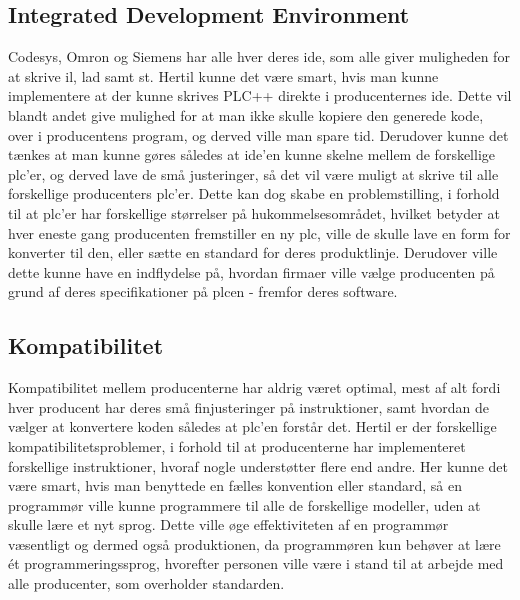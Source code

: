 \subsection*{Integrated Development Environment}
Codesys, Omron og Siemens har alle hver deres \gls{ide}, som alle giver muligheden for at skrive \gls{il}, \gls{lad} samt \gls{st}.
Hertil kunne det være smart, hvis man kunne implementere at der kunne skrives PLC++ direkte i producenternes \gls{ide}. Dette vil blandt andet give mulighed for at man ikke skulle kopiere den generede kode, over i producentens program, og derved ville man spare tid.
\noindent Derudover kunne det tænkes at man kunne gøres således at \gls{ide}'en kunne skelne mellem de forskellige \gls{plc}'er, og derved lave de små justeringer, så det vil være muligt at skrive til alle forskellige producenters \gls{plc}'er.
Dette kan dog skabe en problemstilling, i forhold til at \gls{plc}'er har forskellige størrelser på hukommelsesområdet, hvilket betyder at hver eneste gang producenten fremstiller en ny \gls{plc}, ville de skulle lave en form for konverter til den, eller sætte en standard for deres produktlinje.
Derudover ville dette kunne have en indflydelse på, hvordan firmaer ville vælge producenten på grund af deres specifikationer på \gls{plc}en - fremfor deres software.

\subsection*{Kompatibilitet}
Kompatibilitet mellem producenterne har aldrig været optimal, mest af alt fordi hver producent har deres små finjusteringer på instruktioner, samt hvordan de vælger at konvertere koden således at \gls{plc}'en forstår det.
Hertil er der forskellige kompatibilitetsproblemer, i forhold til at producenterne har implementeret forskellige instruktioner, hvoraf nogle understøtter flere end andre.
Her kunne det være smart, hvis man benyttede en fælles konvention eller standard, så en programmør ville kunne programmere til alle de forskellige modeller, uden at skulle lære et nyt sprog.
Dette ville øge effektiviteten af en programmør væsentligt og dermed også produktionen, da programmøren kun behøver at lære ét programmeringssprog, hvorefter personen ville være i stand til at arbejde med alle producenter, som overholder standarden.